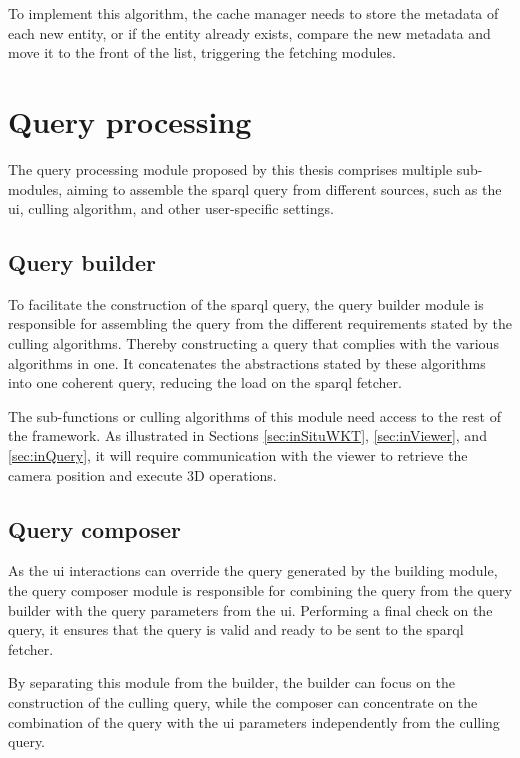 To implement this algorithm, the cache manager needs to store the metadata of each new entity, or if the entity already exists, compare the new metadata and move it to the front of the list, triggering the fetching modules.

\section{Query processing}
The query processing module proposed by this thesis comprises multiple sub-modules, aiming to assemble the \ac{sparql} query from different sources, such as the \ac{ui}, culling algorithm, and other user-specific settings.

\subsection{Query builder}
To facilitate the construction of the \ac{sparql} query, the query builder module is responsible for assembling the query from the different requirements stated by the culling algorithms. Thereby constructing a query that complies with the various algorithms in one. It concatenates the abstractions stated by these algorithms into one coherent query, reducing the load on the \ac{sparql} fetcher.

The sub-functions or culling algorithms of this module need access to the rest of the framework. As illustrated in Sections \ref{sec:inSituWKT}, \ref{sec:inViewer}, and \ref{sec:inQuery}, it will require communication with the viewer to retrieve the camera position and execute 3D operations.

\subsection{Query composer}
As the \ac{ui} interactions can override the query generated by the building module, the query composer module is responsible for combining the query from the query builder with the query parameters from the \ac{ui}. Performing a final check on the query, it ensures that the query is valid and ready to be sent to the \ac{sparql} fetcher.

By separating this module from the builder, the builder can focus on the construction of the culling query, while the composer can concentrate on the combination of the query with the \ac{ui} parameters independently from the culling query.

